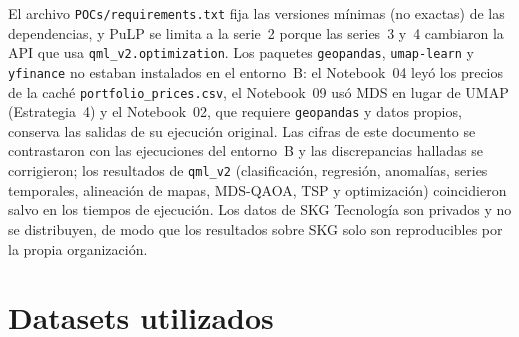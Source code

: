 El archivo \texttt{POCs/requirements.txt} fija las versiones mínimas (no exactas) de las dependencias, y PuLP se limita a la serie~2 porque las series~3 y~4 cambiaron la API que usa \texttt{qml\_v2.optimization}. Los paquetes \texttt{geopandas}, \texttt{umap-learn} y \texttt{yfinance} no estaban instalados en el entorno~B: el Notebook~04 leyó los precios de la caché \texttt{portfolio\_prices.csv}, el Notebook~09 usó MDS en lugar de UMAP (Estrategia~4) y el Notebook~02, que requiere \texttt{geopandas} y datos propios, conserva las salidas de su ejecución original. Las cifras de este documento se contrastaron con las ejecuciones del entorno~B y las discrepancias halladas se corrigieron; los resultados de \texttt{qml\_v2} (clasificación, regresión, anomalías, series temporales, alineación de mapas, MDS-QAOA, TSP y optimización) coincidieron salvo en los tiempos de ejecución. Los datos de SKG Tecnología son privados y no se distribuyen, de modo que los resultados sobre SKG solo son reproducibles por la propia organización.

\section{Datasets utilizados}
\label{anx:datasets}

